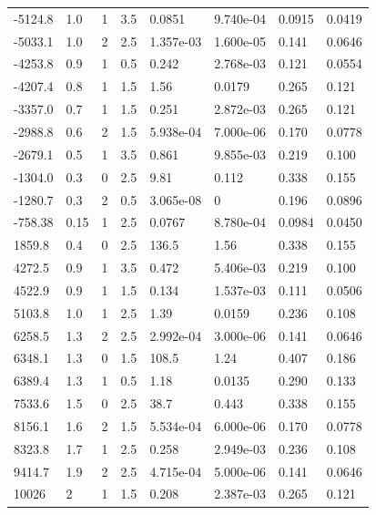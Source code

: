 \documentclass[preview]{standalone}
\begin{document}
{{\begin{tabular}{L{1.2cm}C{1.2cm} C{0.3cm}C{0.5cm} C{1.4cm}C{1.4cm} C{1.4cm}C{1.4cm}}
  -5124.8  &   1.0  & 1     & 3.5 &  0.0851  & 9.740e-04  & 0.0915 &  0.0419   \\ 
  -5033.1  &   1.0  & 2     & 2.5 &  1.357e-03  & 1.600e-05  & 0.141 &  0.0646   \\ 
  -4253.8  &   0.9  & 1     & 0.5 &  0.242  & 2.768e-03  & 0.121 &  0.0554   \\ 
  -4207.4  &   0.8  & 1     & 1.5 &  1.56  & 0.0179  & 0.265 &  0.121   \\ 
  -3357.0  &   0.7  & 1     & 1.5 &  0.251  & 2.872e-03  & 0.265 &  0.121   \\ 
  -2988.8  &   0.6  & 2     & 1.5 &  5.938e-04  & 7.000e-06  & 0.170 &  0.0778   \\ 
  -2679.1  &   0.5  & 1     & 3.5 &  0.861  & 9.855e-03  & 0.219 &  0.100   \\ 
  -1304.0  &   0.3  & 0     & 2.5 &  9.81  & 0.112  & 0.338 &  0.155   \\ 
  -1280.7  &   0.3  & 2     & 0.5 &  3.065e-08  & 0  & 0.196 &  0.0896   \\ 
  -758.38  &  0.15  & 1     & 2.5 &  0.0767  & 8.780e-04  & 0.0984 &  0.0450   \\ 
  1859.8  &   0.4  & 0     & 2.5 &  136.5  & 1.56  & 0.338 &  0.155   \\ 
  4272.5  &   0.9  & 1     & 3.5 &  0.472  & 5.406e-03  & 0.219 &  0.100   \\ 
  4522.9  &   0.9  & 1     & 1.5 &  0.134  & 1.537e-03  & 0.111 &  0.0506   \\ 
  5103.8  &   1.0  & 1     & 2.5 &  1.39  & 0.0159  & 0.236 &  0.108   \\ 
  6258.5  &   1.3  & 2     & 2.5 &  2.992e-04  & 3.000e-06  & 0.141 &  0.0646   \\ 
  6348.1  &   1.3  & 0     & 1.5 &  108.5  & 1.24  & 0.407 &  0.186   \\ 
  6389.4  &   1.3  & 1     & 0.5 &  1.18  & 0.0135  & 0.290 &  0.133   \\ 
  7533.6  &   1.5  & 0     & 2.5 &  38.7  & 0.443  & 0.338 &  0.155   \\ 
  8156.1  &   1.6  & 2     & 1.5 &  5.534e-04  & 6.000e-06  & 0.170 &  0.0778   \\ 
  8323.8  &   1.7  & 1     & 2.5 &  0.258  & 2.949e-03  & 0.236 &  0.108   \\ 
  9414.7  &   1.9  & 2     & 2.5 &  4.715e-04  & 5.000e-06  & 0.141 &  0.0646   \\ 
  10026  &     2  & 1     & 1.5 &  0.208  & 2.387e-03  & 0.265 &  0.121   \\ 

\end{tabular}}}
\end{document}
